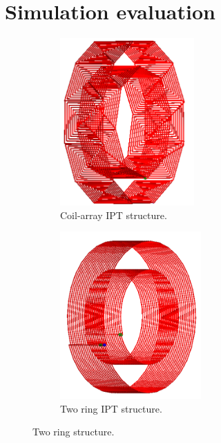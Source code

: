 
\section{Simulation evaluation}


\begin{figure}[htbp]
    \begin{subfigure}{0.5\textwidth}
        \centering
        \includegraphics[height=6.4cm]{images/4_coil_array_system.png}
    \caption{Coil-array IPT structure.}
        \label{fig:subim1}
    \end{subfigure}
    \begin{subfigure}{0.5\textwidth}
        \centering
        \includegraphics[height=6.4cm]{images/4_two_ring_system.png}
    \caption{Two ring IPT structure.}
        \label{fig:subim2}
    \end{subfigure}

    \caption{Two ring structure.}
    \label{fig:3_two_ring_coil}
\end{figure}



